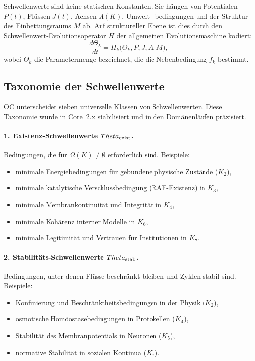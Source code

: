 Schwellenwerte sind keine statischen Konstanten.
Sie hängen von Potentialen \(P(t)\), Flüssen \(J(t)\), Achsen \(A(K)\), Umwelt-\
bedingungen und der Struktur des Einbettungsraums \(M\) ab.
Auf struktureller Ebene ist dies durch den Schwellenwert-Evolutionsoperator
\(H\) der allgemeinen Evolutionsmaschine kodiert:
\[
  \frac{d\Theta_k}{dt}
   = H_k\big(\Theta_k, P, J, A, M\big),
\]
wobei \(\Theta_k\) die Parametermenge bezeichnet, die die Nebenbedingung \(f_k\) bestimmt.

\subsection{Taxonomie der Schwellenwerte}

OC unterscheidet sieben universelle Klassen von Schwellenwerten. Diese Taxonomie wurde
in Core~2.x stabilisiert und in den Domänenläufen präzisiert.

\paragraph{1. Existenz-Schwellenwerte \(\Theta_{\rm exist}\).}
Bedingungen, die für \(\Omega(K)\neq\emptyset\) erforderlich sind.
Beispiele:
\begin{itemize}
    \item minimale Energiebedingungen für gebundene physische Zustände (\(K_2\)),
    \item minimale katalytische Verschlussbedingung (RAF-Existenz) in \(K_3\),
    \item minimale Membrankontinuität und Integrität in \(K_4\),
    \item minimale Kohärenz interner Modelle in \(K_6\),
    \item minimale Legitimität und Vertrauen für Institutionen in \(K_7\).
\end{itemize}

\paragraph{2. Stabilitäts-Schwellenwerte \(\Theta_{\rm stab}\).}
Bedingungen, unter denen Flüsse beschränkt bleiben und Zyklen stabil sind.
Beispiele:
\begin{itemize}
    \item Konfinierung und Beschränktheitsbedingungen in der Physik (\(K_2\)),
    \item osmotische Homöostasebedingungen in Protokellen (\(K_4\)),
    \item Stabilität des Membranpotentials in Neuronen (\(K_5\)),
    \item normative Stabilität in sozialen Kontinua (\(K_7\)).
\end{itemize}

